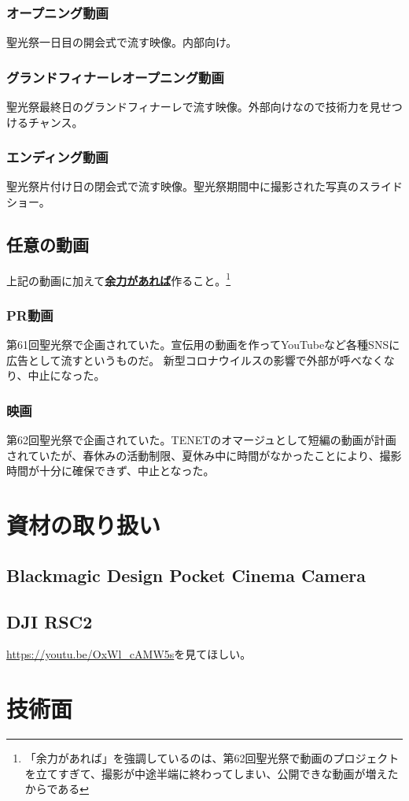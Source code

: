 \documentclass[a4paper]{ltjsreport}
\newcommand{\impact}[1]{\textbf{\gtfamily #1}}
\begin{document}
\subsubsection{オープニング動画}
聖光祭一日目の開会式で流す映像。内部向け。
\subsubsection{グランドフィナーレオープニング動画}
聖光祭最終日のグランドフィナーレで流す映像。外部向けなので技術力を見せつけるチャンス。
\subsubsection{エンディング動画}
聖光祭片付け日の閉会式で流す映像。聖光祭期間中に撮影された写真のスライドショー。
\subsection{任意の動画}
上記の動画に加えて\underline{\impact{余力があれば}}作ること。\footnote{「余力があれば」を強調しているのは、第62回聖光祭で動画のプロジェクトを立てすぎて、撮影が中途半端に終わってしまい、公開できな動画が増えたからである}
\subsubsection{PR動画}
第61回聖光祭で企画されていた。宣伝用の動画を作ってYouTubeなど各種SNSに広告として流すというものだ。
新型コロナウイルスの影響で外部が呼べなくなり、中止になった。
\subsubsection{映画}
第62回聖光祭で企画されていた。TENETのオマージュとして短編の動画が計画されていたが、春休みの活動制限、夏休み中に時間がなかったことにより、撮影時間が十分に確保できず、中止となった。
\section{資材の取り扱い}
\subsection{Blackmagic Design Pocket Cinema Camera}
\subsection{DJI RSC2}
\url{https://youtu.be/OxWl_cAMW5s}を見てほしい。

\section{技術面}
\end{document}
